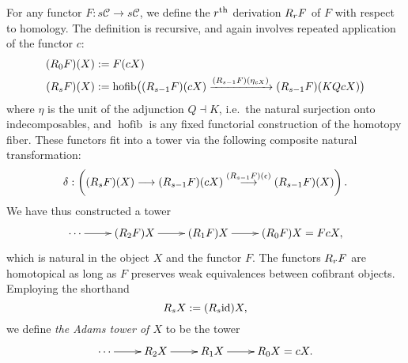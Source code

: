 \documentclass[11pt]{amsart}
\theoremstyle{plain}
\theoremstyle{definition}
\DeclareMathOperator*{\hofib}{hofib}
\renewcommand{\to}{\longrightarrow}
\newcommand{\calC}{\mathcal{C}}
\theoremstyle{plain}
\newcommand{\Id}{\textup{id}}
\newcommand{\algcat}{{\calC}}%
\newcommand{\dupdown}[2]{R_{\smash{#1}}}
\begin{document}
\begin{BK spec seq}
For any functor $F:s\algcat\to s\algcat$, we define the $r^\textup{th}$ derivation $\dupdown{r}{c}F$ of $F$ with respect to  homology. The definition is recursive, and again involves repeated application of the functor $c$: 
\begin{alignat*}{2}
(\dupdown{0}{c}F)(X)
&:=
F(cX)%
\\
(\dupdown{s}{c}F)(X)
&:=
\hofib\bigl((\dupdown{s-1}{c}F)(cX)\xrightarrow{(\dupdown{s-1}{c}F)(\eta_{cX})} (\dupdown{s-1}{c}F)(KQcX)\bigr)
\end{alignat*}
where $\eta$ is the unit of the adjunction $Q\dashv K$, i.e.\ the natural surjection onto indecomposables, and $\hofib$ is any fixed  functorial construction of the homotopy fiber. These functors fit into a tower via the following composite natural transformation:
\[\delta:\left((\dupdown{s}{c}F)(X)\to (\dupdown{s-1}{c}F)(cX)\overset{(\dupdown{s-1}{c}F)(\epsilon)}{\to} (\dupdown{s-1}{c}F)(X)\right).\]
We have thus constructed a tower
\[\xymatrix@R=4mm{
\cdots 
\ar[r]
&%
(\dupdown{2}{c}F)X
\ar[r]
&%
(\dupdown{1}{c}F)X
\ar[r]&%
(\dupdown{0}{c}F)X=FcX,
}\]
which is natural in the object $X$ and the functor $F$.
The functors $\dupdown{r}{c}F$ are homotopical as long as $F$ preserves weak equivalences between cofibrant objects. Employing the shorthand
\[\dupdown{s}{c}X:=(\dupdown{s}{c}\Id )X,\]
we define \emph{the Adams tower of $X$} to be the tower
\[\xymatrix@R=4mm{
\cdots 
\ar[r]
&%
\dupdown{2}{c}X
\ar[r]
&%
\dupdown{1}{c}X
\ar[r]&%
\dupdown{0}{c}X=cX.
}\]


\end{BK spec seq}
\end{document}
